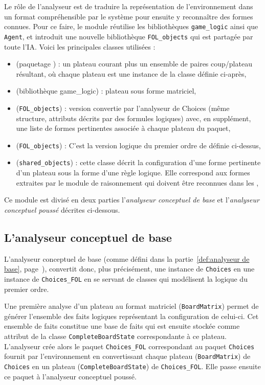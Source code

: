 Le rôle de l'analyseur est de traduire la représentation de l'environnement dans un format compréhensible par le système pour ensuite y reconnaître des formes connues. Pour ce faire, le module réutilise les bibliothèques \texttt{game\_logic} ainsi que \texttt{Agent}, et introduit une nouvelle bibliothèque \texttt{FOL\_objects} qui est partagée par toute l'IA. Voici les principales classes utilisées :

\begin{itemize}
  \item {} (paquetage ) : un plateau courant plus un ensemble de paires coup/plateau résultant, où chaque plateau est une instance de la classe  définie ci-après,
  \item {} (bibliothèque \gls{game_logic}) : plateau sous forme matriciel,
  \item {} (\texttt{FOL\_objects}) : version convertie par l'analyseur de Choices (même structure, attributs décrits par des formules logiques) avec, en supplément, une liste de formes pertinentes associée à chaque plateau du paquet,
  \item {} (\texttt{FOL\_objects}) : C'est la version logique du premier ordre de
   définie ci-dessus,
  \item {} (\texttt{shared\_objects}) : cette classe décrit la configuration d'une forme pertinente d'un plateau sous la forme d'une règle logique. Elle correspond aux formes extraites par le module de raisonnement qui doivent être reconnues dans les ,
\end{itemize}

Ce module est divisé en deux parties l'\emph{analyseur conceptuel de base} et l'\emph{analyseur conceptuel poussé} décrites ci-dessous.
 
\subsection{L'analyseur conceptuel de base}
L'analyseur conceptuel de base (comme défini dans la partie~\ref{def:analyseur de base}, page~\pageref{def:analyseur de base}), convertit donc, plus précisément, une instance de \texttt{Choices} en une instance de \texttt{Choices\_FOL} en se servant de classes qui modélisent la logique du premier ordre. 

Une première analyse d'un plateau au format matriciel (\texttt{BoardMatrix}) permet de générer l'ensemble des faits logiques représentant la configuration de celui-ci. Cet ensemble de faits constitue une base de faits qui est ensuite stockée comme attribut de la classe \texttt{CompleteBoardState} correspondante à ce plateau. L'analyseur crée alors le paquet \texttt{Choices\_FOL} correspondant au paquet \texttt{Choices} fournit par l'environnement en convertissant chaque plateau (\texttt{BoardMatrix}) de \texttt{Choices} en un plateau (\texttt{CompleteBoardState}) de \texttt{Choices\_FOL}. Elle passe ensuite ce paquet à l'analyseur conceptuel poussé. 
